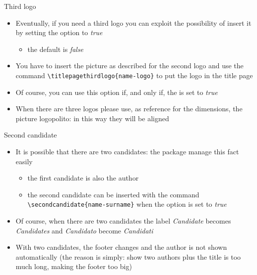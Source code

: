\begin{frame}[fragile]{Third logo}
\begin{itemize}
\item Eventually, if you need a third logo you can exploit the possibility of insert it by setting the option  to \emph{true}
\begin{itemize}
\item the default is \emph{false}
\end{itemize}
\item You have to insert the picture as described for the second logo and use the command \verb!\titlepagethirdlogo{name-logo}!
to put the logo in the title page
\item Of course, you can use this option if, and only if, the  is set to \emph{true}
\item When there are three logos please use, as reference for the dimensions, the picture \alert{logopolito}: in this way they will be aligned
\end{itemize}
\end{frame}

\begin{frame}[t,fragile]{Second candidate}
\begin{itemize}
\item It is possible that there are two candidates: the package manage this fact easily
\begin{itemize}
\item the first candidate is also the author
\item the second candidate can be inserted with the command \verb!\secondcandidate{name-surname}! when the option  is set to \emph{true}
\end{itemize}
\item Of course, when there are two candidates the label \emph{Candidate} becomes \emph{Candidates} and \emph{Candidato} become \emph{Candidati}
\item With two candidates, the footer changes and the author is not shown automatically (the reason is simply: show two authors plus the title is too much long, making the footer too big)
\end{itemize}
\end{frame}

